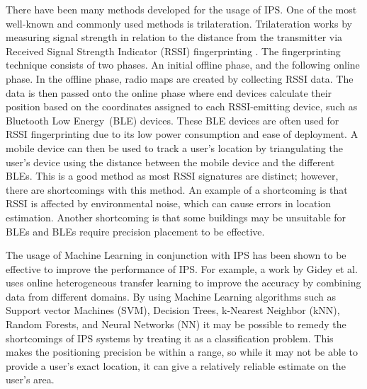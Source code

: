 \documentclass[conference]{IEEEtran}
\begin{document}
	There have been many methods developed for the usage of IPS. One of the most well-known and commonly used methods is trilateration. Trilateration works by measuring signal strength in relation to the distance from the transmitter via Received Signal Strength Indicator (RSSI) fingerprinting \cite{bg2}. The fingerprinting technique consists of two phases. An initial offline phase, and the following online phase. In the offline phase, radio maps are created by collecting RSSI data. The data is then passed onto the online phase where end devices calculate their position based on the coordinates assigned to each RSSI-emitting device, such as Bluetooth Low Energy~(BLE) devices. These BLE devices are often used for RSSI fingerprinting due to its low power consumption and ease of deployment. A mobile device can then be used to track a user's location by triangulating the user's device using the distance between the mobile device and the different BLEs. This is a good method as most RSSI signatures are distinct; however, there are shortcomings with this method. An example of a shortcoming is that RSSI is affected by environmental noise, which can cause errors in location estimation\cite{bgp2}. Another shortcoming is that some buildings may be unsuitable for BLEs and BLEs require precision placement to be effective.
	
	The usage of Machine Learning in conjunction with IPS has been shown to be effective to improve the performance of IPS. For example, a work by Gidey et al. \cite{bgp3} uses online heterogeneous transfer learning to improve the accuracy by combining data from different domains. By using Machine Learning algorithms such as Support vector Machines (SVM), Decision Trees, k-Nearest Neighbor (kNN), Random Forests, and Neural Networks (NN) it may be possible to remedy the shortcomings of IPS systems by treating it as a classification problem. This makes the positioning precision be within a range, so while it may not be able to provide a user's exact location, it can give a relatively reliable estimate on the user's area.
	
\end{document}
